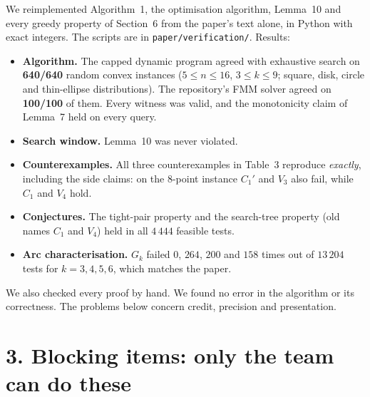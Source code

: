 \documentclass[11pt,a4paper]{article}
\begin{document}
We reimplemented Algorithm~1, the optimisation algorithm, Lemma~10 and every greedy
property of Section~6 from the paper's text alone, in Python with exact integers. The
scripts are in \texttt{paper/verification/}. Results:
\begin{itemize}
\item \textbf{Algorithm.} The capped dynamic program agreed with exhaustive search on
  \textbf{640/640} random convex instances ($5\le n\le16$, $3\le k\le9$; square,
  disk, circle and thin-ellipse distributions). The repository's FMM solver agreed on
  \textbf{100/100} of them. Every witness was valid, and the monotonicity claim of
  Lemma~7 held on every query.
\item \textbf{Search window.} Lemma~10 was never violated.
\item \textbf{Counterexamples.} All three counterexamples in Table~3 reproduce
  \emph{exactly}, including the side claims: on the 8-point instance $C_1'$ and
  $V_3$ also fail, while $C_1$ and $V_4$ hold.
\item \textbf{Conjectures.} The tight-pair property and the search-tree property
  (old names $C_1$ and $V_4$) held in all $4\,444$ feasible tests.
\item \textbf{Arc characterisation.} $G_k$ failed $0$, $264$, $200$ and $158$ times
  out of $13\,204$ tests for $k=3,4,5,6$, which matches the paper.
\end{itemize}
We also checked every proof by hand. We found no error in the algorithm or its
correctness. The problems below concern credit, precision and presentation.

\section*{3. Blocking items: only the team can do these}
\end{document}
